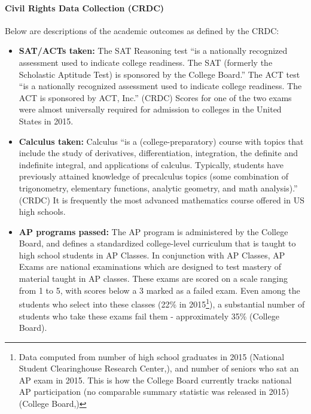 \documentclass[11pt]{article}
\begin{document}
\paragraph{Civil Rights Data Collection (CRDC)}

Below are descriptions of the academic outcomes as defined by the CRDC:
\begin{itemize}
\item \textbf{SAT/ACTs taken:}  The SAT Reasoning test ``is a nationally recognized assessment used to indicate college readiness. The SAT (formerly the Scholastic Aptitude Test) is sponsored by the College Board.''  The ACT test ``is a nationally recognized assessment used to indicate college readiness. The ACT is sponsored by ACT, Inc.'' (CRDC\cite{noauthor_master_2016}) Scores for one of the two exams were almost universally required for admission to colleges in the United States in 2015.

\item \textbf{Calculus taken:}  Calculus ``is a (college-preparatory) course with topics that include the study of derivatives, differentiation, integration, the definite and indefinite integral, and applications of calculus. Typically, students have previously attained knowledge of precalculus topics (some combination of trigonometry, elementary functions, analytic geometry, and math analysis).'' (CRDC\cite{noauthor_master_2016}) It is frequently the most advanced mathematics course offered in US high schools.


\item \textbf{AP programs passed:} %
The AP program is administered by the College Board, and defines a standardized college-level curriculum that is taught to high school students in AP Classes. In conjunction with AP Classes, AP Exams are national examinations which are designed to test mastery of material taught in AP classes. These exams are scored on a scale ranging from 1 to 5, with scores below a 3 marked as a failed exam. Even among the students who select into these classes (22\% in 2015\footnote{ Data computed from number of high school graduates in 2015 (National Student Clearinghouse Research Center,\cite{noauthor_high_2015}), and number of seniors who sat an AP exam in 2015. This is how the College Board currently tracks national AP participation (no comparable summary statistic was released in 2015) (College Board,\cite{noauthor_ap_2015})}), a substantial number of students who take these exams fail them - approximately 35\% (College Board\cite{noauthor_ap_2020}). 


\end{itemize}
\end{document}
